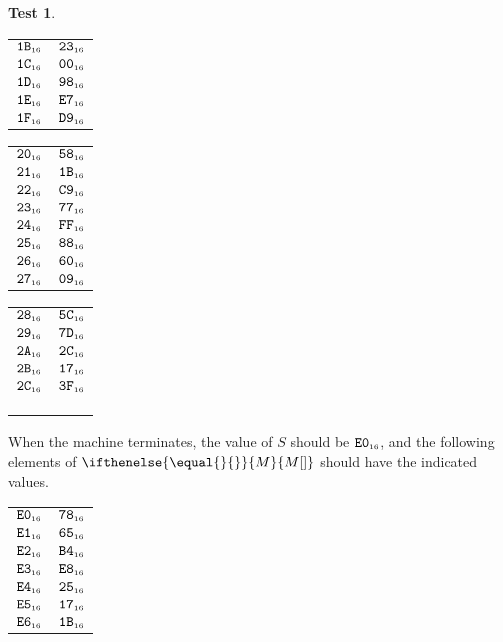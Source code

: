 \documentclass[a4paper,12pt]{article}
\makeatletter
\newcommand{\num}[1]{\texttt{#1}}
\newcommand{\hex}[1]{\num{#1}_{\textup{\tiny 16}}}
\newcommand{\MEM}[1]{\ifthenelse{\equal{#1}{}}{M}{M[#1]}}
\newcommand{\SP}{S}
\theoremstyle{definition}
\newtheorem{test}{Test}
\newenvironment{memtable}{%
  \begin{trivlist}
    \item
    }{%
    \end{trivlist}}
\newenvironment{memcolumn}{%
  \begin{tabular}{@{}ll@{}}
    \hline}
    {%
    \hline
  \end{tabular}}
\newcommand{\memspace}{\qquad}
\makeatother
\begin{document}
\begin{test}
\begin{memtable}
\begin{memcolumn}
      $\hex{1B}$ & $\hex{23}$ \\
      $\hex{1C}$ & $\hex{00}$ \\
      $\hex{1D}$ & $\hex{98}$ \\
      $\hex{1E}$ & $\hex{E7}$ \\
      $\hex{1F}$ & $\hex{D9}$ \\
    \end{memcolumn}
    \memspace
    \begin{memcolumn}
      $\hex{20}$ & $\hex{58}$ \\
      $\hex{21}$ & $\hex{1B}$ \\
      $\hex{22}$ & $\hex{C9}$ \\
      $\hex{23}$ & $\hex{77}$ \\
      $\hex{24}$ & $\hex{FF}$ \\
      $\hex{25}$ & $\hex{88}$ \\
      $\hex{26}$ & $\hex{60}$ \\
      $\hex{27}$ & $\hex{09}$ \\
    \end{memcolumn}
    \memspace
    \begin{memcolumn}
      $\hex{28}$ & $\hex{5C}$ \\
      $\hex{29}$ & $\hex{7D}$ \\
      $\hex{2A}$ & $\hex{2C}$ \\
      $\hex{2B}$ & $\hex{17}$ \\
      $\hex{2C}$ & $\hex{3F}$ \\
      \\
      \\
      \\
    \end{memcolumn}
  \end{memtable}
  When the machine terminates, the value of $\SP$ should be $\hex{E0}$, and the following elements of $\MEM{}$ should have the indicated values.
  \begin{memtable}
    \begin{memcolumn}
      $\hex{E0}$ & $\hex{78}$ \\
      $\hex{E1}$ & $\hex{65}$ \\
      $\hex{E2}$ & $\hex{B4}$ \\
      $\hex{E3}$ & $\hex{E8}$ \\
      $\hex{E4}$ & $\hex{25}$ \\
      $\hex{E5}$ & $\hex{17}$ \\
      $\hex{E6}$ & $\hex{1B}$ \\

\end{memcolumn}
\end{memtable}
\end{test}
\end{document}
